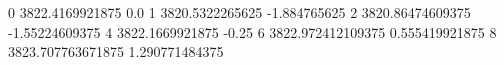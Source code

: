 0 3822.4169921875 0.0
1 3820.5322265625 -1.884765625
2 3820.86474609375 -1.55224609375
4 3822.1669921875 -0.25
6 3822.972412109375 0.555419921875
8 3823.707763671875 1.290771484375
